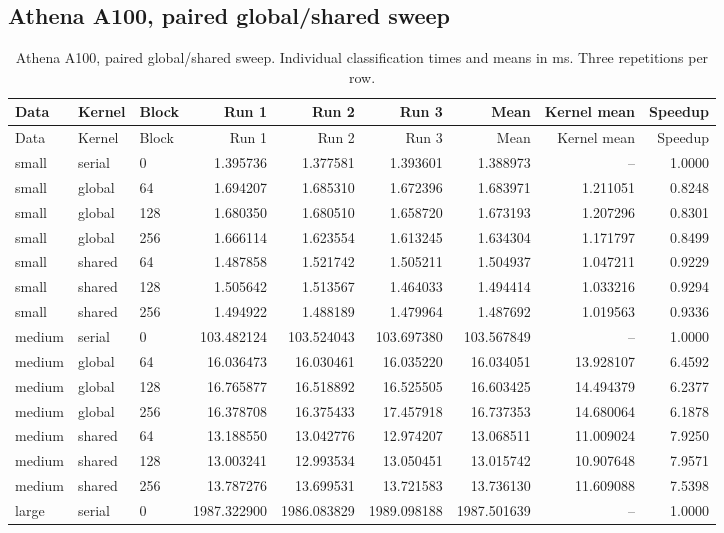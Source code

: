 \subsection{Athena A100, paired global/shared sweep}
\small
\begin{longtable}{lllrrrrrr}
\caption{Athena A100, paired global/shared sweep. Individual classification times and means in ms. Three repetitions per row.}\\
\toprule
Data & Kernel & Block & Run 1 & Run 2 & Run 3 & Mean & Kernel mean & Speedup \\
\midrule\endfirsthead
\toprule
Data & Kernel & Block & Run 1 & Run 2 & Run 3 & Mean & Kernel mean & Speedup \\
\midrule\endhead
\bottomrule\endfoot
small & serial & 0 & 1.395736 & 1.377581 & 1.393601 & 1.388973 & -- & 1.0000 \\
small & global & 64 & 1.694207 & 1.685310 & 1.672396 & 1.683971 & 1.211051 & 0.8248 \\
small & global & 128 & 1.680350 & 1.680510 & 1.658720 & 1.673193 & 1.207296 & 0.8301 \\
small & global & 256 & 1.666114 & 1.623554 & 1.613245 & 1.634304 & 1.171797 & 0.8499 \\
small & shared & 64 & 1.487858 & 1.521742 & 1.505211 & 1.504937 & 1.047211 & 0.9229 \\
small & shared & 128 & 1.505642 & 1.513567 & 1.464033 & 1.494414 & 1.033216 & 0.9294 \\
small & shared & 256 & 1.494922 & 1.488189 & 1.479964 & 1.487692 & 1.019563 & 0.9336 \\
medium & serial & 0 & 103.482124 & 103.524043 & 103.697380 & 103.567849 & -- & 1.0000 \\
medium & global & 64 & 16.036473 & 16.030461 & 16.035220 & 16.034051 & 13.928107 & 6.4592 \\
medium & global & 128 & 16.765877 & 16.518892 & 16.525505 & 16.603425 & 14.494379 & 6.2377 \\
medium & global & 256 & 16.378708 & 16.375433 & 17.457918 & 16.737353 & 14.680064 & 6.1878 \\
medium & shared & 64 & 13.188550 & 13.042776 & 12.974207 & 13.068511 & 11.009024 & 7.9250 \\
medium & shared & 128 & 13.003241 & 12.993534 & 13.050451 & 13.015742 & 10.907648 & 7.9571 \\
medium & shared & 256 & 13.787276 & 13.699531 & 13.721583 & 13.736130 & 11.609088 & 7.5398 \\
large & serial & 0 & 1987.322900 & 1986.083829 & 1989.098188 & 1987.501639 & -- & 1.0000 \\

\end{longtable}
